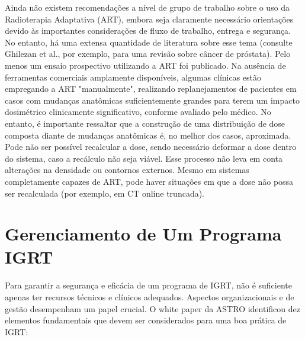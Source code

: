 \documentclass[11pt,a4paper]{article}
\newcounter{exemplo}
\begin{document}
	Ainda não existem recomendações a nível de grupo de trabalho sobre o uso da Radioterapia Adaptativa (ART), embora seja claramente necessário orientações devido às importantes considerações de fluxo de trabalho, entrega e segurança. No entanto, há uma extensa quantidade de literatura sobre esse tema (consulte Ghilezan et al., por exemplo, para uma revisão sobre câncer de próstata). Pelo menos um ensaio prospectivo utilizando a ART foi publicado. Na ausência de ferramentas comerciais amplamente disponíveis, algumas clínicas estão empregando a ART "manualmente", realizando replanejamentos de pacientes em casos com mudanças anatômicas suficientemente grandes para terem um impacto dosimétrico clinicamente significativo, conforme avaliado pelo médico. No entanto, é importante ressaltar que a construção de uma distribuição de dose composta diante de mudanças anatômicas é, no melhor dos casos, aproximada. Pode não ser possível recalcular a dose, sendo necessário deformar a dose dentro do sistema, caso a recálculo não seja viável. Esse processo não leva em conta alterações na densidade ou contornos externos. Mesmo em sistemas completamente capazes de ART, pode haver situações em que a dose não possa ser recalculada (por exemplo, em CT online truncada). 


\section{Gerenciamento de Um Programa IGRT}

	Para garantir a segurança e eficácia de um programa de IGRT, não é suficiente apenas ter recursos técnicos e clínicos adequados. Aspectos organizacionais e de gestão desempenham um papel crucial. O white paper da ASTRO identificou dez elementos fundamentais que devem ser considerados para uma boa prática de IGRT:
\end{document}
